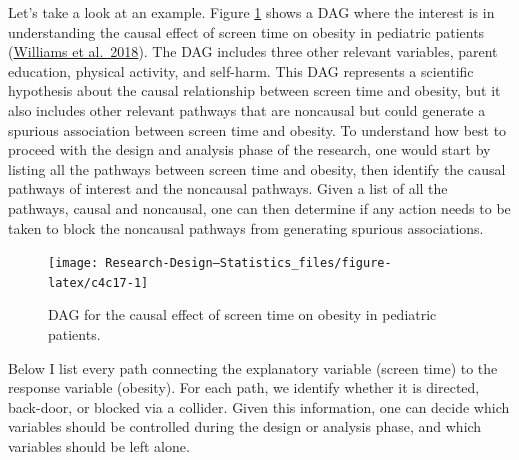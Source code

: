 \documentclass[
]{book}
\begin{document}
Let's take a look at an example. Figure \ref{fig:c4c17} shows a DAG where the interest is in understanding the causal effect of screen time on obesity in pediatric patients (\href{https://www.nature.com/articles/s41390-018-0071-3}{Williams et al.~2018}). The DAG includes three other relevant variables, parent education, physical activity, and self-harm. This DAG represents a scientific hypothesis about the causal relationship between screen time and obesity, but it also includes other relevant pathways that are noncausal but could generate a spurious association between screen time and obesity. To understand how best to proceed with the design and analysis phase of the research, one would start by listing all the pathways between screen time and obesity, then identify the causal pathways of interest and the noncausal pathways. Given a list of all the pathways, causal and noncausal, one can then determine if any action needs to be taken to block the noncausal pathways from generating spurious associations.

\begin{figure}

{\centering \texttt{[image: Research-Design---Statistics\_files/figure-latex/c4c17-1]} 

}

\caption{DAG for the causal effect of screen time on obesity in pediatric patients.}\label{fig:c4c17}
\end{figure}

Below I list every path connecting the explanatory variable (screen time) to the response variable (obesity). For each path, we identify whether it is directed, back-door, or blocked via a collider. Given this information, one can decide which variables should be controlled during the design or analysis phase, and which variables should be left alone.
\end{document}
